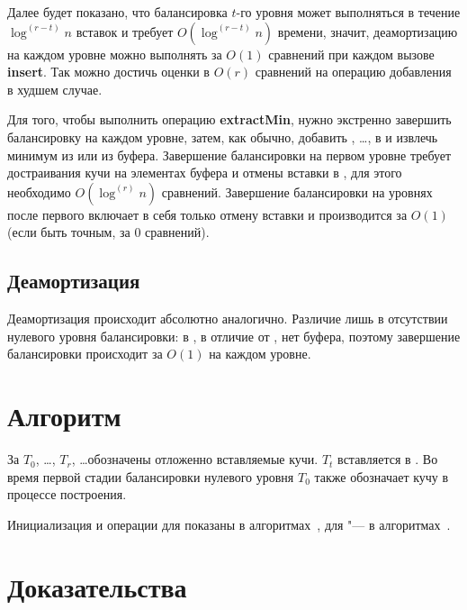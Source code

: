 Далее будет показано, что балансировка $t$-го уровня может выполняться
в течение $\log^{(r-t)}n$ вставок и требует $O(\log^{(r-t)}n)$ времени,
значит, деамортизацию на каждом уровне
можно выполнять за $O(1)$ сравнений при каждом вызове \textbf{insert}. Так можно
достичь оценки в $O(r)$ сравнений на операцию добавления в худшем случае.

Для того, чтобы выполнить операцию \textbf{extractMin}, нужно экстренно завершить
балансировку на каждом уровне, затем, как обычно, добавить \MH[1], \dots, \MH[r] в \HH
и извлечь минимум из \HH или из буфера. Завершение балансировки на первом уровне
требует достраивания кучи на элементах буфера и отмены вставки в \MH[1], для этого
необходимо $O(\log^{(r)} n)$ сравнений. Завершение балансировки на уровнях после
первого включает в себя только отмену вставки и производится за $O(1)$ (если быть
точным, за 0 сравнений).

\subsection{Деамортизация \CH[*]}
Деамортизация \CH[*] происходит абсолютно аналогично. Различие лишь в отсутствии
нулевого уровня  балансировки: в \CH[*], в отличие от \CH[r], нет буфера,
поэтому завершение балансировки происходит за $O(1)$ на каждом уровне.

\section{Алгоритм}
За $T_0$, \dots, $T_{r}$, \dots обозначены отложенно вставляемые кучи.
$T_t$ вставляется в \MH[t+1]. Во время первой стадии балансировки нулевого
уровня $T_0$ также обозначает кучу в процессе построения.

Инициализация и операции для \CH[r] показаны в
алгоритмах~, для \CH[*] "---
в алгоритмах~.


\newpage
\section{Доказательства} \label{sec:proof}

